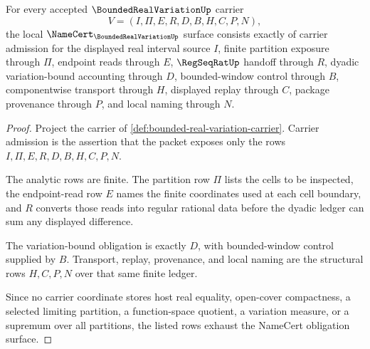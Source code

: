 \begin{theorem}
\label{thm:bounded-real-variation-namecert-obligations}
For every accepted $\BoundedRealVariationUp$ carrier
$$
V=(I,\Pi,E,R,D,B,H,C,P,N),
$$
the local $\NameCert_{\BoundedRealVariationUp}$ surface consists exactly of carrier admission for the displayed real interval source $I$, finite partition exposure through $\Pi$, endpoint reads through $E$, $\RegSeqRatUp$ handoff through $R$, dyadic variation-bound accounting through $D$, bounded-window control through $B$, componentwise transport through $H$, displayed replay through $C$, package provenance through $P$, and local naming through $N$.
\end{theorem}
\begin{proof}
Project the carrier of \autoref{def:bounded-real-variation-carrier}. Carrier admission is the assertion that the packet exposes only the rows $I,\Pi,E,R,D,B,H,C,P,N$.

The analytic rows are finite. The partition row $\Pi$ lists the cells to be inspected, the endpoint-read row $E$ names the finite coordinates used at each cell boundary, and $R$ converts those reads into regular rational data before the dyadic ledger can sum any displayed difference.

The variation-bound obligation is exactly $D$, with bounded-window control supplied by $B$. Transport, replay, provenance, and local naming are the structural rows $H,C,P,N$ over that same finite ledger.

Since no carrier coordinate stores host real equality, open-cover compactness, a selected limiting partition, a function-space quotient, a variation measure, or a supremum over all partitions, the listed rows exhaust the NameCert obligation surface.
\end{proof}


